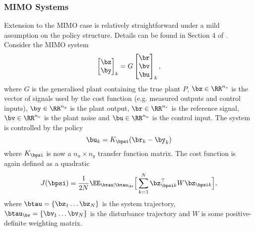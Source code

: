\subsubsection{MIMO Systems}
Extension to the MIMO case is relatively straightforward under a mild assumption on the policy structure. Details can be found in Section 4 of \cite{Hja02}. Consider the MIMO system
\begin{equation}
\begin{bmatrix}\bz \\ \by \end{bmatrix}_k = G \begin{bmatrix} \br \\ \bv \\ \bu \end{bmatrix}_k,
\end{equation}
where $G$ is the generalised plant containing the true plant $P$, $\bz \in \RR^{n_z}$ is the vector of signals used by the cost function (e.g. measured outputs and control inputs), $\by \in \RR^{n_y}$ is the plant output, $\br \in \RR^{n_r}$ is the reference signal, $\bv \in \RR^{n_v}$ is the plant noise and $\bu \in \RR^{n_u}$ is the control input. The system is controlled by the policy
\begin{equation}
\bu_k = K_{\bpsi} (\br_k - \by_k)
\end{equation}
where $K_{\bpsi}$ is now a $n_u \times n_y$ transfer function matrix. The cost function is again defined as a quadratic
\begin{equation}
J(\bpsi) = \frac{1}{2N} \EE_{\btau|\btau_{\bv}} \Big[ \sum_{k=1}^N \bz_{\bpsi k}^\top W \bz_{\bpsi k} \Big],
\end{equation}
where $\btau = \{ \bz_1 \dots \bz_N \}$ is the system trajectory, $\btau_{\bv} = \{ \bv_1 \dots \bv_N \}$ is the disturbance trajectory and $W$ is some positive-definite weighting matrix.


